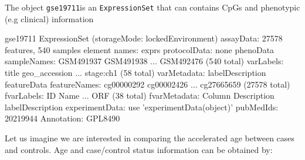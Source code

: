 \documentclass[]{article}
\newcommand{\hlnum}[1]{\textcolor[rgb]{0.816,0.125,0.439}{#1}}%
\newcommand{\hlstr}[1]{\textcolor[rgb]{0.251,0.627,0.251}{#1}}%
\newcommand{\hlopt}[1]{\textcolor[rgb]{0,0,0}{#1}}%
\newcommand{\hlstd}[1]{\textcolor[rgb]{0.251,0.251,0.251}{#1}}%
\newcommand{\hlkwd}[1]{\textcolor[rgb]{0.878,0.439,0.125}{#1}}%
\newenvironment{Shaded}{\begin{myshaded}}{\end{myshaded}}
\newcommand{\KeywordTok}[1]{\hlkwd{#1}}
\newcommand{\DecValTok}[1]{\hlnum{#1}}
\newcommand{\StringTok}[1]{\hlstr{#1}}
\newcommand{\OperatorTok}[1]{\hlopt{#1}}
\newcommand{\NormalTok}[1]{\hlstd{#1}}
\begin{document}
The object \texttt{gse19711}is an \texttt{ExpressionSet} that can contains CpGs and phenotypic (e.g clinical) information

\begin{Shaded}
\begin{Highlighting}[]
\NormalTok{gse19711}
  \KeywordTok{ExpressionSet}\NormalTok{ (storageMode}\OperatorTok{:}\StringTok{ }\NormalTok{lockedEnvironment)}
\NormalTok{  assayData}\OperatorTok{:}\StringTok{ }\DecValTok{27578}\NormalTok{ features, }\DecValTok{540}\NormalTok{ samples }
\NormalTok{    element names}\OperatorTok{:}\StringTok{ }\NormalTok{exprs }
\NormalTok{  protocolData}\OperatorTok{:}\StringTok{ }\NormalTok{none}
\NormalTok{  phenoData}
\NormalTok{    sampleNames}\OperatorTok{:}\StringTok{ }\NormalTok{GSM491937 GSM491938 ... }\KeywordTok{GSM492476}\NormalTok{ (}\DecValTok{540}\NormalTok{ total)}
\NormalTok{    varLabels}\OperatorTok{:}\StringTok{ }\NormalTok{title geo_accession ... stage}\OperatorTok{:}\KeywordTok{ch1}\NormalTok{ (}\DecValTok{58}\NormalTok{ total)}
\NormalTok{    varMetadata}\OperatorTok{:}\StringTok{ }\NormalTok{labelDescription}
\NormalTok{  featureData}
\NormalTok{    featureNames}\OperatorTok{:}\StringTok{ }\NormalTok{cg00000292 cg00002426 ... }\KeywordTok{cg27665659}\NormalTok{ (}\DecValTok{27578}\NormalTok{ total)}
\NormalTok{    fvarLabels}\OperatorTok{:}\StringTok{ }\NormalTok{ID Name ... }\KeywordTok{ORF}\NormalTok{ (}\DecValTok{38}\NormalTok{ total)}
\NormalTok{    fvarMetadata}\OperatorTok{:}\StringTok{ }\NormalTok{Column Description labelDescription}
\NormalTok{  experimentData}\OperatorTok{:}\StringTok{ }\NormalTok{use }\StringTok{'experimentData(object)'}
\NormalTok{    pubMedIds}\OperatorTok{:}\StringTok{ }\DecValTok{20219944} 
\NormalTok{  Annotation}\OperatorTok{:}\StringTok{ }\NormalTok{GPL8490}
\end{Highlighting}
\end{Shaded}

Let us imagine we are interested in comparing the accelerated age between cases and controls. Age and case/control status information can be obtained by:
\end{document}
